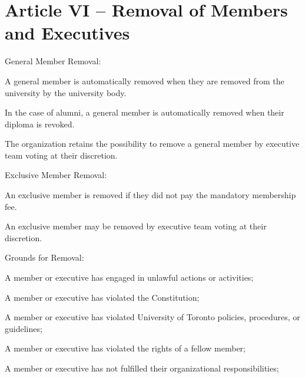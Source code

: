 \documentclass[12pt,a4paper]{article}
\begin{document}
\section{Article VI – Removal of Members and Executives}

\begin{constitutionlist}
\item General Member Removal:

\begin{constitutionlist}
\item A general member is automatically removed when they are removed from the university by the university body.

\item In the case of alumni, a general member is automatically removed when their diploma is revoked.

\item The organization retains the possibility to remove a general member by executive team voting at their discretion.
\end{constitutionlist}

\item Exclusive Member Removal:

\begin{constitutionlist}
\item An exclusive member is removed if they did not pay the mandatory membership fee.

\item An exclusive member may be removed by executive team voting at their discretion.
\end{constitutionlist}

\item Grounds for Removal:

\begin{constitutionlist}
\item A member or executive has engaged in unlawful actions or activities;

\item A member or executive has violated the Constitution;

\item A member or executive has violated University of Toronto policies, procedures, or guidelines;

\item A member or executive has violated the rights of a fellow member;

\item A member or executive has not fulfilled their organizational responsibilities;


\end{constitutionlist}
\end{constitutionlist}
\end{document}
